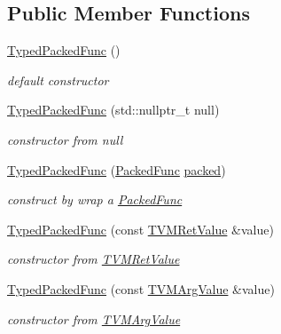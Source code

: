 \subsection*{Public Member Functions}
\begin{DoxyCompactItemize}
\item 
\hyperlink{classtvm_1_1runtime_1_1TypedPackedFunc_3_01R_07Args_8_8_8_08_4_a4abadc6786dd14a3aed6e2b5b342d1d6}{Typed\+Packed\+Func} ()
\begin{DoxyCompactList}\small\item\em default constructor \end{DoxyCompactList}\item 
\hyperlink{classtvm_1_1runtime_1_1TypedPackedFunc_3_01R_07Args_8_8_8_08_4_af45a2ceff92e6f6c394ea766a45027a0}{Typed\+Packed\+Func} (std\+::nullptr\+\_\+t null)
\begin{DoxyCompactList}\small\item\em constructor from null \end{DoxyCompactList}\item 
\hyperlink{classtvm_1_1runtime_1_1TypedPackedFunc_3_01R_07Args_8_8_8_08_4_afd8ee9dd9648c19b468bb4b0b00e8e4e}{Typed\+Packed\+Func} (\hyperlink{classtvm_1_1runtime_1_1PackedFunc}{Packed\+Func} \hyperlink{classtvm_1_1runtime_1_1TypedPackedFunc_3_01R_07Args_8_8_8_08_4_ac0ad0eb56ab0f12d91adb50dab38ddab}{packed})
\begin{DoxyCompactList}\small\item\em construct by wrap a \hyperlink{classtvm_1_1runtime_1_1PackedFunc}{Packed\+Func} \end{DoxyCompactList}\item 
\hyperlink{classtvm_1_1runtime_1_1TypedPackedFunc_3_01R_07Args_8_8_8_08_4_a6b346a6d0b601eff5a100c7a207e9c86}{Typed\+Packed\+Func} (const \hyperlink{classtvm_1_1runtime_1_1TVMRetValue}{T\+V\+M\+Ret\+Value} \&value)
\begin{DoxyCompactList}\small\item\em constructor from \hyperlink{classtvm_1_1runtime_1_1TVMRetValue}{T\+V\+M\+Ret\+Value} \end{DoxyCompactList}\item 
\hyperlink{classtvm_1_1runtime_1_1TypedPackedFunc_3_01R_07Args_8_8_8_08_4_a0161d426f9ca366c860ad48c384f7192}{Typed\+Packed\+Func} (const \hyperlink{classtvm_1_1runtime_1_1TVMArgValue}{T\+V\+M\+Arg\+Value} \&value)
\begin{DoxyCompactList}\small\item\em constructor from \hyperlink{classtvm_1_1runtime_1_1TVMArgValue}{T\+V\+M\+Arg\+Value} \end{DoxyCompactList}\item 

\end{DoxyCompactItemize}
